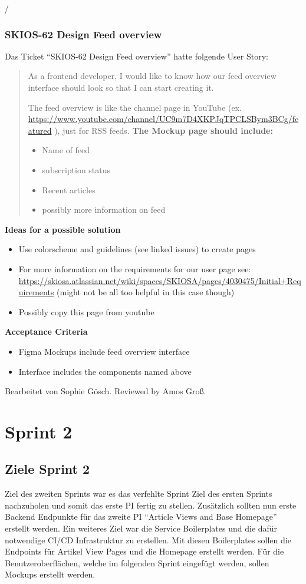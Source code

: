 /\subsubsection{SKIOS-62 Design Feed overview}
Das Ticket \enquote{SKIOS-62 Design Feed overview} hatte folgende User Story:
\begin{quotation}
    As a frontend developer, I would like to know how our feed overview interface should look so that I can start creating it.

    The feed overview is like the channel page in YouTube (ex. \url{https://www.youtube.com/channel/UC9m7D4XKPJqTPCLSBym3BCg/featured} ), just for RSS feeds.
    \textbf{The Mockup page should include:}
        \begin{itemize}
            \item Name of feed
            \item subscription status
            \item Recent articles
            \item possibly more information on feed
        \end{itemize}
\end{quotation}
\textbf{Ideas for a possible solution}
    \begin{itemize}
        \item Use colorscheme and guidelines (see linked issues) to create pages
        \item For more information on the requirements for our user page see: \url{https://skiosa.atlassian.net/wiki/spaces/SKIOSA/pages/4030475/Initial+Requirements} (might not be all too helpful in this case though)
        \item Possibly copy this page from youtube
    \end{itemize}
\textbf{Acceptance Criteria}
    \begin{itemize}
        \item Figma Mockups include feed overview interface
        \item Interface includes the components named above
    \end{itemize}
Bearbeitet von Sophie Gösch.
Reviewed by Amos Groß.

\section{Sprint 2}

\subsection{Ziele Sprint 2}
Ziel des zweiten Sprints war es das verfehlte Sprint Ziel des ersten Sprints nachzuholen und somit das erste \ac{PI} fertig zu stellen. Zusätzlich sollten nun erste Backend Endpunkte für das zweite \ac{PI} \enquote{Article Views and Base Homepage} erstellt werden.
Ein weiteres Ziel war die Service Boilerplates und die dafür notwendige \ac{CI/CD} Infrastruktur zu erstellen. Mit diesen Boilerplates sollen die Endpoints für Artikel View Pages und die Homepage erstellt werden.
Für die Benutzeroberflächen, welche im folgenden Sprint eingefügt werden, sollen Mockups erstellt werden. 

